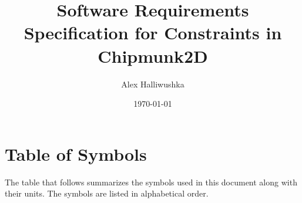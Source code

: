 \documentclass[12pt]{article}
\begin{document}
\title{Software Requirements Specification for Constraints in Chipmunk2D} 
\author{Alex Halliwushka}
\date{\today}
	
\maketitle

\tableofcontents

\section{Table of Symbols}

The table that follows summarizes the symbols used in this document along with
their units. The symbols are listed in alphabetical order.

\renewcommand{\arraystretch}{1.2}
\end{document}
